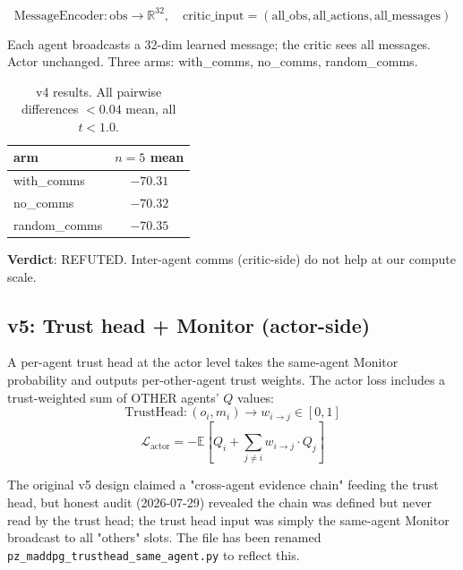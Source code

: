 \documentclass[11pt]{article}
\begin{document}
\begin{equation}
\text{MessageEncoder}: \text{obs} \to \mathbb{R}^{32}, \quad
\text{critic\_input} = (\text{all\_obs}, \text{all\_actions}, \text{all\_messages})
\end{equation}

Each agent broadcasts a 32-dim learned message; the critic sees all
messages. Actor unchanged. Three arms: with\_comms, no\_comms,
random\_comms.

\begin{table}[h]
\centering
\begin{tabular}{lc}
\toprule
arm & $n=5$ mean \\
\midrule
with\_comms   & $-70.31$ \\
no\_comms     & $-70.32$ \\
random\_comms & $-70.35$ \\
\bottomrule
\end{tabular}
\caption{v4 results. All pairwise differences $< 0.04$ mean, all
$t<1.0$.}
\end{table}

\textbf{Verdict}: REFUTED. Inter-agent comms (critic-side) do not
help at our compute scale.

\subsection{v5: Trust head + Monitor (actor-side)}

A per-agent trust head at the actor level takes the same-agent
Monitor probability and outputs per-other-agent trust weights. The
actor loss includes a trust-weighted sum of OTHER agents' $Q$
values:
\begin{equation}
\text{TrustHead}: (o_i, m_i) \to w_{i \to j} \in [0, 1]
\end{equation}
\begin{equation}
\mathcal{L}_{\text{actor}} = -\mathbb{E}\left[Q_i + \sum_{j \neq i} w_{i \to j} \cdot Q_j\right]
\end{equation}

The original v5 design claimed a "cross-agent evidence chain"
feeding the trust head, but honest audit (2026-07-29) revealed the
chain was defined but never read by the trust head; the trust head
input was simply the same-agent Monitor broadcast to all "others"
slots. The file has been renamed
\texttt{pz\_maddpg\_trusthead\_same\_agent.py} to reflect this.
\end{document}
